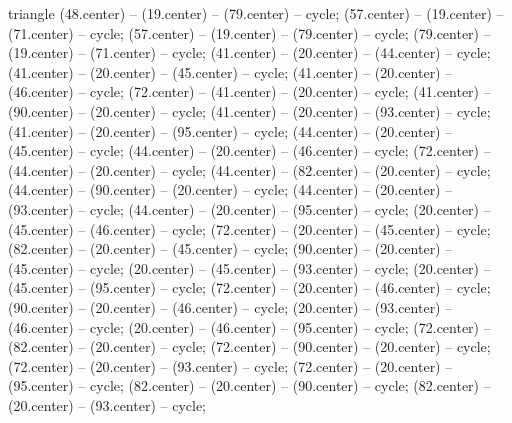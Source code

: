 {\begin{pgfonlayer}{triangle}
 (48.center) -- (19.center) -- (79.center) -- cycle; 
 (57.center) -- (19.center) -- (71.center) -- cycle; 
 (57.center) -- (19.center) -- (79.center) -- cycle; 
 (79.center) -- (19.center) -- (71.center) -- cycle; 
 (41.center) -- (20.center) -- (44.center) -- cycle; 
 (41.center) -- (20.center) -- (45.center) -- cycle; 
 (41.center) -- (20.center) -- (46.center) -- cycle; 
 (72.center) -- (41.center) -- (20.center) -- cycle; 
 (41.center) -- (90.center) -- (20.center) -- cycle; 
 (41.center) -- (20.center) -- (93.center) -- cycle; 
 (41.center) -- (20.center) -- (95.center) -- cycle; 
 (44.center) -- (20.center) -- (45.center) -- cycle; 
 (44.center) -- (20.center) -- (46.center) -- cycle; 
 (72.center) -- (44.center) -- (20.center) -- cycle; 
 (44.center) -- (82.center) -- (20.center) -- cycle; 
 (44.center) -- (90.center) -- (20.center) -- cycle; 
 (44.center) -- (20.center) -- (93.center) -- cycle; 
 (44.center) -- (20.center) -- (95.center) -- cycle; 
 (20.center) -- (45.center) -- (46.center) -- cycle; 
 (72.center) -- (20.center) -- (45.center) -- cycle; 
 (82.center) -- (20.center) -- (45.center) -- cycle; 
 (90.center) -- (20.center) -- (45.center) -- cycle; 
 (20.center) -- (45.center) -- (93.center) -- cycle; 
 (20.center) -- (45.center) -- (95.center) -- cycle; 
 (72.center) -- (20.center) -- (46.center) -- cycle; 
 (90.center) -- (20.center) -- (46.center) -- cycle; 
 (20.center) -- (93.center) -- (46.center) -- cycle; 
 (20.center) -- (46.center) -- (95.center) -- cycle; 
 (72.center) -- (82.center) -- (20.center) -- cycle; 
 (72.center) -- (90.center) -- (20.center) -- cycle; 
 (72.center) -- (20.center) -- (93.center) -- cycle; 
 (72.center) -- (20.center) -- (95.center) -- cycle; 
 (82.center) -- (20.center) -- (90.center) -- cycle; 
 (82.center) -- (20.center) -- (93.center) -- cycle; 

\end{pgfonlayer}}
